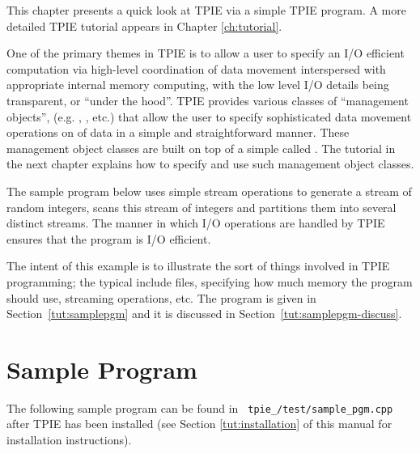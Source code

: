 This chapter presents a quick look
at TPIE via a simple TPIE program. A more detailed TPIE
tutorial appears in Chapter \ref{ch:tutorial}. 

One of the primary themes in TPIE is to allow a user to
specify an I/O efficient computation via 
high-level coordination of data movement interspersed with
appropriate internal memory computing, with the low level I/O
details being transparent, or ``under the hood''.
TPIE provides various classes of ``management objects'',
(e.g. , , etc.) that
allow the user to specify sophisticated data movement
operations on  of data in a simple and
straightforward manner. These management object classes are
built on top of a simple  called
. The tutorial in the next chapter explains
how to specify and use such management object classes.

The sample program below uses simple stream
operations %
to generate a stream of random integers, scans this stream
of integers and partitions them into several distinct
streams. The manner in which I/O operations are handled by
TPIE ensures that the program is I/O efficient.


The intent of this example is to illustrate the sort of
things involved in TPIE programming; the typical include
files, specifying how much memory the program should use,
streaming operations, etc. The program is given in
Section~\ref{tut:samplepgm} and it is discussed in
Section~\ref{tut:samplepgm-discuss}.


\section{Sample Program}

The following sample program can be found in {\tt
   tpie\_\version/test/sample\_pgm.cpp} after TPIE has been
   installed (see Section \ref{tut:installation} of this manual for installation instructions).

